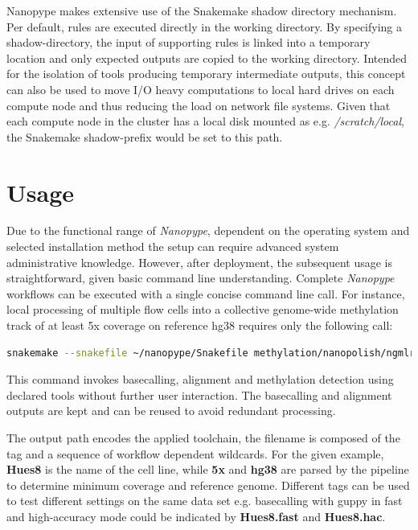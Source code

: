 Nanopype makes extensive use of the Snakemake shadow directory mechanism. Per default, rules are executed directly in the working directory. By specifying a shadow-directory, the input of supporting rules is linked into a temporary location and only expected outputs are copied to the working directory. Intended for the isolation of tools producing temporary intermediate outputs, this concept can also be used to move I/O heavy computations to local hard drives on each compute node and thus reducing the load on network file systems. Given that each compute node in the cluster has a local disk mounted as e.g. \textit{/scratch/local}, the Snakemake shadow-prefix would be set to this path.




\section{Usage}
\label{sec:nanopype:usage}
Due to the functional range of \textit{Nanopype}, dependent on the operating system and selected installation method the setup can require advanced system administrative knowledge. However, after deployment, the subsequent usage is straightforward, given basic command line understanding. Complete \textit{Nanopype} workflows can be executed with a single concise command line call. For instance, local processing of multiple flow cells into a collective genome-wide methylation track of at least 5x coverage on reference hg38 requires only the following call:

\begin{lstlisting}[language=sh, caption=Snakemake example]
snakemake --snakefile ~/nanopype/Snakefile methylation/nanopolish/ngmlr/guppy/Hues8.5x.hg38.bw
\end{lstlisting}

This command invokes basecalling, alignment and methylation detection using declared tools without further user interaction. The basecalling and alignment outputs are kept and can be reused to avoid redundant processing.

The output path encodes the applied toolchain, the filename is composed of the tag and a sequence of workflow dependent wildcards. For the given example, \textbf{Hues8} is the name of the cell line, while \textbf{5x} and \textbf{hg38} are parsed by the pipeline to determine minimum coverage and reference genome. Different tags can be used to test different settings on the same data set e.g. basecalling with guppy in fast and high-accuracy mode could be indicated by \textbf{Hues8.fast} and \textbf{Hues8.hac}.


